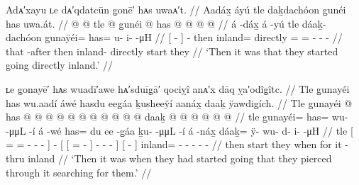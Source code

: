 
\ex\label{ex:92-46-started-going-directly-inland}%
%
\begingl
	\glpreamble	Adᴀ′xayu ʟe dᴀ′qdatcūn g̣onē′ hᴀs uwaᴀ′t. //
	\glpreamble	Aadáx̱ áyú tle daḵdachóon g̱unéi has uwa.át. //
	\gla	{}  @ {} {}  @ {}
		tle  @ {}
		g̱unéi @ has @  @ {} @ {} @ {} //
	\glb	{} á -dáx̱ {} á -yú
		tle dáaḵ- dachóon
		g̱unaÿéi= has= u- i-  -μH //
	\glc	{}[  - {}]  -
		then inland= directly
		= = - -  - //
	\gld	{} that -after {}  {}
		then inland- directly
		start they  {} {} {} //
	\glft	‘Then it was that they started going directly inland.’
		//
\endgl
\xe

\ex\label{ex:92-47-started-going-pierced-thru-searching}%
%
\begingl
	\glpreamble	ʟe g̣onayē′ hᴀs wuadī′awe hᴀ′sduīg̣ā′ qociỵî anᴀ′x dāq ỵa′odîg̣îtc. //
	\glpreamble	Tle g̱unayéi has wu.aadí áwé hasdu eeg̱áa ḵusheeÿí aanáx̱ daaḵ ÿawdig̱ích. //
	\gla	Tle {} g̱unayéi @ has @  @ {} @ {} @ {} {}
		 @ {}
		{} {}  @ {}  @ {} {} 
			 @ {} @ {} @ {} {}
		{}  @ {} {}
		daaḵ @  @ {} @ {} @ {} @ {} @ {} //
	\glb	tle {} g̱unayéi= has= wu-  -μμL -í {}
		á -wé
		{} {} has= du ee -g̱áa {}
			ḵu-  -μμL -í {}
		{} á -náx̱ {}
		dáaḵ= ÿ- wu- d- i-  -μH //
	\glc	tle {}[ = = -
			 - - {}]
		 -
		{}[ {}[ =   - {}]
			-  - - {}]
		{}[  - {}]
		inland= - - - -  - //
	\gld	then {} start they  {} {} \·when {}
		 {}
		{} {}  {} {} \·for {}
			 {} {} {} {}
		{} it -thru {}
		inland  {} {} {} {} {} //
	\glft	‘Then it was when they had started going that they pierced through it searching for them.’
		//
\endgl
\xe

